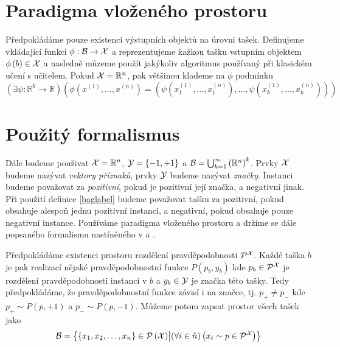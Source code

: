 \section{Paradigma vloženého prostoru}
Předpokládáme pouze existenci výstupních objektů na úrovni tašek. Definujeme vkládající funkci \( \phi : \mathcal B \to \mathcal X \) a reprezentujeme kažkou tašku vstupním objektem \( \phi \left( b \right) \in \mathcal X \) a nasledně můzeme použít jakýkoliv algoritmus používaný při klasickém učení s učitelem. Pokud \( \mathcal X = \mathbb R^n \), pak většinou klademe na \( \phi \) podmínku
\begin{equation}
	\left( \exists \psi : \mathbb R^k \to \mathbb R \right) \left( \phi \left( x^{(1)}, \dots, x^{(n)} \right) = \left( \psi \left( x_1^{(1)}, \dots, x_1^{(n)} \right), \dots, \psi \left( x_k^{(1)}, \dots, x_k^{(n)} \right) \right) \right)
\end{equation}

\section{Použitý formalismus}
Dále budeme použivat \( \mathcal X = \mathbb R^n \), \( \mathcal Y = \left\{ -1, +1 \right\} \) a \( \mathcal B = \bigcup_{k = 1}^{\infty} \left( \mathbb R^n \right) ^k \). Prvky \( \mathcal X \) budeme nazývat \textit{vektory příznaků}, prvky \( \mathcal Y \) budeme nazývat \textit{značky}. Instanci budeme považovat za \textit{pozitivní}, pokud je pozitivní její značka, a negativní jinak. Při použití definice \eqref{baglabel} budeme považovat tašku za pozitivní, pokud obsahuje alespoň jednu pozitivní instanci, a negativní, pokud obsahuje pouze negativní instance. Používáme paradigma vloženého prostoru a držíme se dále popsaného formalismu nastíněného v \cite{pevny_using_2016} a \cite{pevny_discriminative_2016}.

Předpokládáme existenci prostoru rozdělení pravděpodobnosti \( \mathcal P^{\mathcal X} \). Každé taška \( b \) je pak realizací nějaké pravděpodobnostní funkce \( P \left( p_b, y_b \right) \) kde \( p_b \in \mathcal P^{\mathcal X} \) je rozdělení pravděpodobnosti instancí v \( b \) a \( y_b \in \mathcal Y \) je značka této tašky. Tedy předpokládáme, že pravděpodobnostní funkce závisí i na značce, tj. \( p_+ \neq p_- \) kde \( p_+ \sim P(p, +1) \) a \( p_- \sim P(p, -1) \). Můžeme potom zapsat prostor všech tašek jako
\begin{equation}
	\mathcal B = \left\{ \left\{ x_1, x_2, \dots, x_n \right\} \in \mathcal P \left( \mathcal X \right) \middle| \left( \forall i \in \hat n \right) \left( x_i \sim p \in \mathcal P^{\mathcal X} \right) \right\}
\end{equation}

